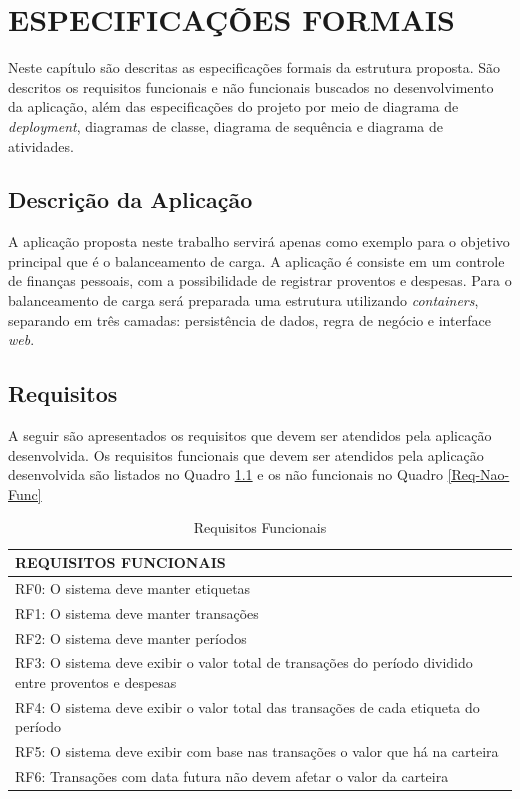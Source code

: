 \chapter{ESPECIFICAÇÕES FORMAIS}
	Neste capítulo são descritas as especificações formais da estrutura proposta. São descritos os requisitos funcionais e não funcionais buscados no desenvolvimento da aplicação, além das especificações do projeto por meio de diagrama de \textit{deployment}, diagramas de classe, diagrama de sequência e diagrama de atividades.
	
\section{Descrição da Aplicação}
	A aplicação proposta neste trabalho servirá apenas como exemplo para o objetivo principal que é o balanceamento de carga. A aplicação é consiste em um controle de finanças pessoais, com a possibilidade de registrar proventos e despesas. Para o balanceamento de carga será preparada uma estrutura utilizando \textit{containers}, separando em três camadas: persistência de dados, regra de negócio e interface \textit{web}.
	
\section{Requisitos}
	A seguir são apresentados os requisitos que devem ser atendidos pela aplicação desenvolvida. Os requisitos funcionais que devem ser atendidos pela aplicação desenvolvida são listados no Quadro \ref{Req-Func} e os não funcionais no Quadro \ref{Req-Nao-Func}
	
	\begin{table}[h]
		\caption{Requisitos Funcionais}
		\label{Req-Func}
		\begin{tabular}{|l|}
			\hline
			\textbf{REQUISITOS FUNCIONAIS} \\ \hline
			RF0: O sistema deve manter etiquetas \\ \hline
			RF1: O sistema deve manter transações \\ \hline
			RF2: O sistema deve manter períodos \\ \hline
			RF3: O sistema deve exibir o valor total de transações do período dividido entre proventos e despesas \\
			 \hline
	 		RF4: O sistema deve exibir o valor total das transações de cada etiqueta do período \\ \hline
			RF5: O sistema deve exibir com base nas transações o valor que há na carteira \\ \hline
			RF6: Transações com data futura não devem afetar o valor da carteira \\ \hline
		\end{tabular}
	\end{table}

